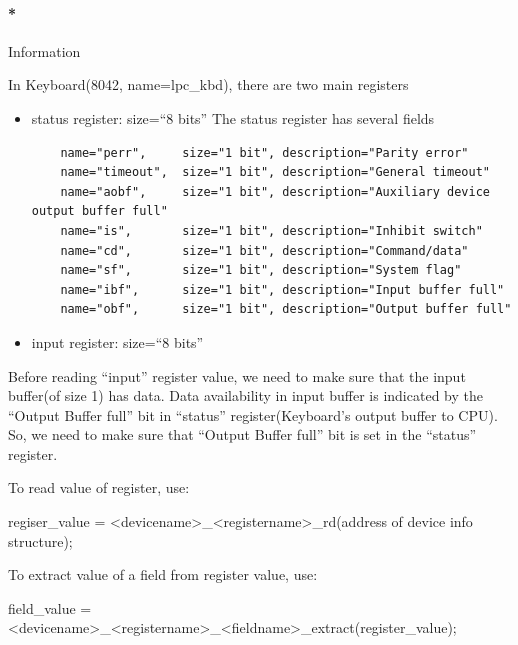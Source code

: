 \documentclass[]{article}
\newenvironment{Shaded}{}{}
\newcommand{\NormalTok}[1]{{#1}}
\let\oldparagraph\paragraph
\renewcommand{\paragraph}[1]{\oldparagraph{#1}\mbox{}}
\begin{document}
\paragraph*{Information}\label{information-2}

In Keyboard(8042, name=lpc\_kbd), there are two main registers

\begin{itemize}
\item
  status register: size=``8 bits'' The status register has several
  fields

\begin{verbatim}
    name="perr",     size="1 bit", description="Parity error"
    name="timeout",  size="1 bit", description="General timeout"
    name="aobf",     size="1 bit", description="Auxiliary device output buffer full"
    name="is",       size="1 bit", description="Inhibit switch"
    name="cd",       size="1 bit", description="Command/data"
    name="sf",       size="1 bit", description="System flag"
    name="ibf",      size="1 bit", description="Input buffer full"
    name="obf",      size="1 bit", description="Output buffer full"
\end{verbatim}
\item
  input register: size=``8 bits''
\end{itemize}

Before reading ``input'' register value, we need to make sure that the
input buffer(of size 1) has data. Data availability in input buffer is
indicated by the ``Output Buffer full'' bit in ``status''
register(Keyboard's output buffer to CPU). So, we need to make sure that
``Output Buffer full'' bit is set in the ``status'' register.

To read value of register, use:

\begin{Shaded}
\begin{Highlighting}[]
    \NormalTok{regiser_value = <devicename>_<registername>_rd(address of device info structure);}
\end{Highlighting}
\end{Shaded}

To extract value of a field from register value, use:

\begin{Shaded}
\begin{Highlighting}[]
    \NormalTok{field_value = <devicename>_<registername>_<fieldname>_extract(register_value);}
\end{Highlighting}
\end{Shaded}
\end{document}
